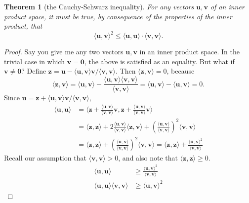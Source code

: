 \documentclass[draft,12pt]{report}
\newtheorem{theorem}{Theorem}
\renewcommand{\vec}[1]{\mathbf{#1}}
\begin{document}
\begin{theorem}[the Cauchy-Schwarz inequality]
    For any vectors $\vec{u}, \vec{v}$ of an inner product space, it must be true, by consequence of the properties of the inner product, that
    \[ \langle \vec{u}, \vec{v} \rangle^2 \leq \langle \vec{u}, \vec{u} \rangle \cdot \langle \vec{v}, \vec{v} \rangle. \]
\end{theorem}
\begin{proof}
    Say you give me any two vectors $\vec{u}, \vec{v}$ in an inner product space. In the trivial case in which $\vec{v} = \vec{0}$, the above is satisfied as an equality. But what if $\vec{v} \neq \vec{0}$? Define $\vec{z} = \vec{u} - \langle \vec{u}, \vec{v} \rangle \vec{v} / \langle \vec{v}, \vec{v} \rangle$. Then $\langle \vec{z}, \vec{v} \rangle = 0$, because
    \[ \langle \vec{z}, \vec{v} \rangle = \langle \vec{u}, \vec{v} \rangle - \frac{\langle \vec{u}, \vec{v} \rangle \langle \vec{v}, \vec{v} \rangle}{\langle \vec{v}, \vec{v} \rangle} = \langle \vec{u}, \vec{v} \rangle - \langle \vec{u}, \vec{v} \rangle = 0. \]
    Since $\vec{u} = \vec{z} + \langle \vec{u}, \vec{v} \rangle \vec{v} / \langle \vec{v}, \vec{v} \rangle$,
    \begin{align*}
        \langle \vec{u}, \vec{u} \rangle &= \langle \vec{z} + \frac{\langle \vec{u}, \vec{v} \rangle}{\langle \vec{v}, \vec{v} \rangle} \vec{v}, \vec{z} + \frac{\langle \vec{u}, \vec{v} \rangle}{\langle \vec{v}, \vec{v} \rangle} \vec{v} \rangle \\
        &= \langle \vec{z}, \vec{z} \rangle + 2 \frac{\langle \vec{u}, \vec{v} \rangle}{\langle \vec{v}, \vec{v} \rangle} \langle \vec{z}, \vec{v} \rangle + \left( \frac{\langle \vec{u}, \vec{v} \rangle}{\langle \vec{v}, \vec{v} \rangle} \right)^2 \langle \vec{v}, \vec{v} \rangle \\
        &= \langle \vec{z}, \vec{z} \rangle + \left( \frac{\langle \vec{u}, \vec{v} \rangle}{\langle \vec{v}, \vec{v} \rangle} \right)^2 \langle \vec{v}, \vec{v} \rangle = \langle \vec{z}, \vec{z} \rangle + \frac{\langle \vec{u}, \vec{v} \rangle^2}{\langle \vec{v}, \vec{v} \rangle}
    \end{align*}
    Recall our assumption that $\langle \vec{v}, \vec{v} \rangle > 0$, and also note that $\langle \vec{z}, \vec{z} \rangle \geq 0$.
    \begin{align*}
        \langle \vec{u}, \vec{u} \rangle &\geq \frac{\langle \vec{u}, \vec{v} \rangle^2}{\langle \vec{v}, \vec{v} \rangle} \\
        \langle \vec{u}, \vec{u} \rangle \langle \vec{v}, \vec{v} \rangle &\geq \langle \vec{u}, \vec{v} \rangle^2
    \end{align*}
\end{proof}
\end{document}
